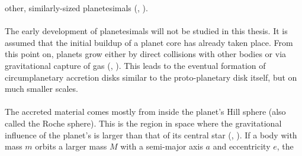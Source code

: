       other, similarly-sized planetesimals
      (\citeauthor{Morbidelli_2016}, \citeyear{Morbidelli_2016}). \\
      \\
      The early development of planetesimals will not be studied in this 
      thesis. It is assumed that the initial buildup of a planet core has 
      already taken place. From this point on, planets grow either by
      direct collisions with other bodies or via gravitational capture of gas
      (\citeauthor{Morbidelli_2016}, \citeyear{Morbidelli_2016}).
      This leads to the eventual formation of circumplanetary accretion disks
      similar to the proto-planetary disk itself, 
      but on much smaller scales. %
      \\
      \\
      The accreted material comes mostly from inside the planet's Hill sphere 
      (also called the Roche sphere). %
      This is the region in space where the gravitational 
      influence of the planet's is larger than that of its central star
      (\citeauthor{Hamilton_1992}, \citeyear{Hamilton_1992}). 
      If a body with mass $m$ orbits a larger 
      mass $M$ with a semi-major axis $a$ and eccentricity $e$, the 
